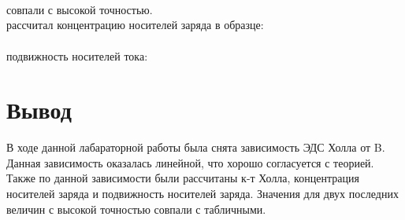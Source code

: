 \noindent{} \\

\noindent{} \\

\noindent{} \\

  совпали с высокой точностью. \\

 рассчитал концентрацию носителей заряда в образце: \\
 \\ 

 подвижность носителей тока: \\

\section{Вывод}
В ходе данной лабараторной работы была снята зависимость ЭДС Холла от B. Данная зависимость оказалась линейной, что хорошо согласуется с теорией. Также по данной зависимости были рассчитаны к-т Холла, концентрация носителей заряда и подвижность носителей заряда. Значения для двух последних величин с высокой точностью совпали с табличными.